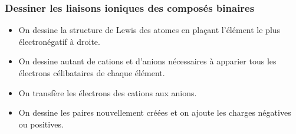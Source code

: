 \documentclass[
  11pt,
  a4paper,
  openany]{book}
\providecommand{\tightlist}{%
  \setlength{\itemsep}{0pt}\setlength{\parskip}{0pt}}
\begin{document}
\newpage

\hypertarget{dessiner-les-liaisons-ioniques-des-composuxe9s-binaires}{%
\subsubsection{Dessiner les liaisons ioniques des composés binaires}\label{dessiner-les-liaisons-ioniques-des-composuxe9s-binaires}}

\begin{itemize}
\tightlist
\item
  On dessine la structure de Lewis des atomes en plaçant l'élément le plus électronégatif à droite.
\item
  On dessine autant de cations et d'anions nécessaires à apparier tous les électrons célibataires de chaque élément.
\item
  On transfère les électrons des cations aux anions.
\item
  On dessine les paires nouvellement créées et on ajoute les charges négatives ou positives.
\end{itemize}
\end{document}

